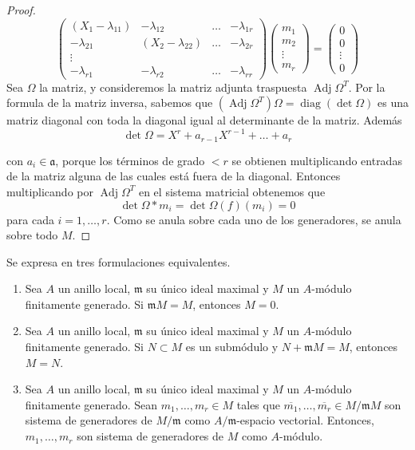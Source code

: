 \documentclass[../main.tex]{subfiles}
\begin{document}
\begin{proof}
	\begin{equation}
		\begin{pmatrix}
			(X_1 - \lambda_{11}) & -\lambda_{12} & \dots & -\lambda_{1r} \\
			-\lambda_{21}  &(X_2 - \lambda_{22})& \dots &- \lambda_{2r} \\
			\vdots \\
			-\lambda_{r1}  & - \lambda_{r2} & \dots &- \lambda_{rr}
		\end{pmatrix}
		\begin{pmatrix}
			m_1 \\ m_2 \\\vdots \\ m_r
		\end{pmatrix}
		= \begin{pmatrix}
			0 \\0 \\ \vdots \\0
		\end{pmatrix}
	\end{equation}
	Sea $\Omega$ la matriz, y consideremos la matriz adjunta traspuesta $\operatorname{Adj} \Omega^{T}$. Por la formula de la matriz inversa, sabemos que $(\operatorname{Adj} \Omega^{T})\Omega = \operatorname{diag}(\det \Omega)$ es una matriz diagonal con toda la diagonal igual al determinante de la matriz. Además
	$$
		\det\Omega = X^r+a_{r-1}X^{r-1} + \dots + a_r
	$$

	con $a_i \in \mathfrak a$, porque los términos de grado $<r$ se obtienen multiplicando entradas de la matriz alguna de las cuales está fuera de la diagonal. Entonces multiplicando por $\operatorname{Adj} \Omega^{T}$ en el sistema matricial obtenemos que
	$$
		\det \Omega \ast m_i = \det \Omega (f) (m_i) = 0
	$$
	para cada $i=1, \dots, r$. Como se anula sobre cada uno de los generadores, se anula sobre todo $M$.
\end{proof}
\begin{lemma} \label{Nak} Se expresa en tres formulaciones equivalentes.\begin{enumerate}
		\item Sea $A$ un anillo local, $\mathfrak{m}$ su único ideal maximal y $M$ un $A$-módulo finitamente generado. Si $\mathfrak{m} M=M$, entonces $M=0$.
		\item Sea $A$ un anillo local, $\mathfrak{m}$ su único ideal maximal y $M$ un $A$-módulo finitamente generado. Si $N\subset M$ es un submódulo y $N+\mathfrak{m}M=M$, entonces $M=N$.
		\item Sea $A$ un anillo local, $\mathfrak{m}$ su único ideal maximal y $M$ un $A$-módulo finitamente generado. Sean $m_1,\dots,m_r\in M$ tales que $\overline{m_1},\dots,\overline{m_r}\in M/\mathfrak{m}M$ son sistema de generadores de $M/\mathfrak{m}$ como $A/\mathfrak{m}$-espacio vectorial. Entonces, $m_1,\dots,m_r$ son sistema de generadores de $M$ como $A$-módulo.
	\end{enumerate}
\end{lemma}
\end{document}
